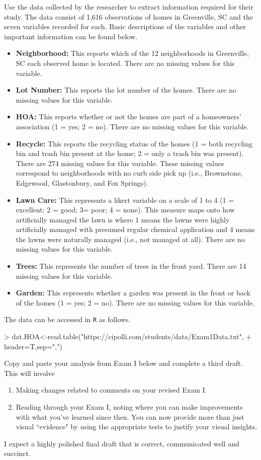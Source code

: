 \documentclass{article}
\begin{document}
Use the data collected by the researcher to extract information required for their study. The data consist of 1,616 observations of homes in Greenville, SC and the seven variables recorded for each. 
Basic descriptions of the variables and other important information can be found below.
\begin{itemize}
\item \textbf{Neighborhood:} This reports which of the 12 neighborhoods in Greenville, SC each observed home is located. There are no missing values for this variable. 
\item \textbf{Lot Number:} This reports the lot number of the homes. There are no missing values for this variable. 
\item \textbf{HOA:} This reports whether or not the homes are part of a homeowners' association (1 = yes; 2 = no). There are no missing values for this variable.
\item \textbf{Recycle:} This reports the recycling status of the homes (1 = both recycling bin and trash bin present at the home; 2 = only a trash bin was present). There are 274 missing values for this variable. These missing values correspond to neighborhoods with no curb side pick up (i.e., Brownstone, Edgewood, Glastonbury, and Fox Springs).
\item \textbf{Lawn Care:} This represents a likert variable on a scale of 1 to 4 (1 = excellent; 2 = good; 3= poor; 4 = none). This measure
maps onto how artificially managed the lawn is where 1 means the lawns were highly artificially managed with presumed regular chemical application and 4 means the lawns were naturally managed (i.e., not managed at all). There are no missing values for this variable.
\item \textbf{Trees:} This represents the number of trees in the front yard. There are 14 missing values for this variable. 
\item \textbf{Garden:} This represents whether a garden was present in the front or back of the homes (1 = yes; 2 = no). There are no missing values for this variable.
\end{itemize}
The data can be accessed in \texttt{R} as follows.
\begin{Schunk}
\begin{Sinput}
> dat.HOA<-read.table("https://cipolli.com/students/data/Exam1Data.txt",
+               header=T,sep=",")
\end{Sinput}
\end{Schunk}
Copy and paste your analysis from Exam I below and complete a third draft. This will involve
\begin{enumerate}
  \item Making changes related to comments on your revised Exam I.
  \item Reading through your Exam I, noting where you can make improvements with
  what you've learned since then. You can now provide more than just visual ``evidence"
  by using the appropriate tests to justify your visual insights.
\end{enumerate}
I expect a highly polished final draft that is correct, communicated well and succinct. 
\end{document}
